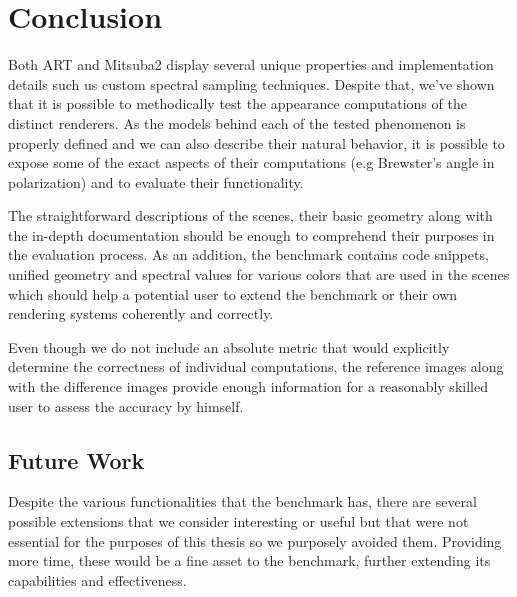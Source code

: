 \chapter*{Conclusion}

Both ART and Mitsuba2 display several unique properties and implementation details such us custom spectral sampling techniques. Despite that, we've shown that it is possible to methodically test the appearance computations of the distinct renderers. As the models behind each of the tested phenomenon is properly defined and we can also describe their natural behavior, it is possible to expose some of the exact aspects of their computations (e.g Brewster's angle in polarization) and to evaluate their functionality.

The straightforward descriptions of the scenes, their basic geometry along with the in-depth documentation should be enough to comprehend their purposes in the evaluation process. As an addition, the benchmark contains code snippets, unified geometry and spectral values for various colors that are used in the scenes which should help a potential user to extend the benchmark or their own rendering systems coherently and correctly.

Even though we do not include an absolute metric that would explicitly determine the correctness of individual computations, the reference images along with the difference images provide enough information for a reasonably skilled user to assess the accuracy by himself.

\section{Future Work}

Despite the various functionalities that the benchmark has, there are several possible extensions that we consider interesting or useful but that were not essential for the purposes of this thesis so we purposely avoided them. Providing more time, these would be a fine asset to the benchmark, further extending its capabilities and effectiveness.

